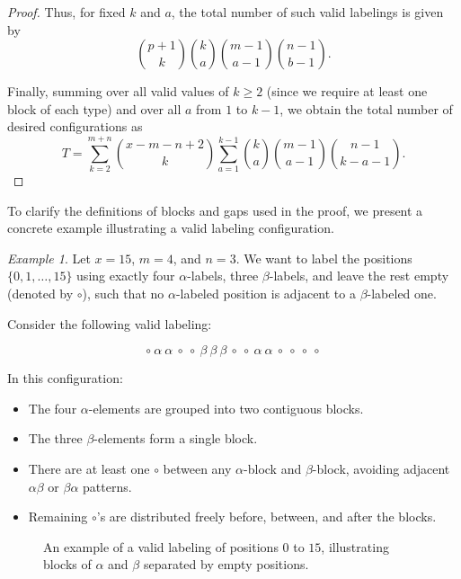 \documentclass{birkjour}
\theoremstyle{definition}
\theoremstyle{remark}
\newtheorem*{example}{Example}
\numberwithin{equation}{section}
\begin{document}
\begin{proof}
Thus, for fixed \( k \) and \( a \), the total number of such valid labelings is given by
\[
\binom{p+1}{k} \binom{k}{a} \binom{m-1}{a-1} \binom{n-1}{b-1}.
\]

Finally, summing over all valid values of \( k \geq 2 \) (since we require at least one block of each type) and over all \( a \) from \( 1 \) to \( k - 1 \), we obtain the total number of desired configurations as
\[
T = \sum_{k=2}^{m+n} \binom{x - m - n + 2}{k} \sum_{a=1}^{k-1} \binom{k}{a} \binom{m - 1}{a - 1} \binom{n - 1}{k - a - 1}.
\]
\end{proof}
To clarify the definitions of blocks and gaps used in the proof, we present a concrete example illustrating a valid labeling configuration.
\begin{example}
Let \( x = 15 \), \( m = 4 \), and \( n = 3 \). We want to label the positions \( \{0,1,\dots,15\} \) using exactly four \( \alpha \)-labels, three \( \beta \)-labels, and leave the rest empty (denoted by \( \circ \)), such that no \( \alpha \)-labeled position is adjacent to a \( \beta \)-labeled one.

Consider the following valid labeling:

\[
\circ\ \alpha\ \alpha\ \circ\ \circ\ \beta\ \beta\ \beta\ \circ\ \circ\ \alpha\ \alpha\ \circ\ \circ\ \circ\ \circ
\]

In this configuration:
\begin{itemize}
    \item The four \( \alpha \)-elements are grouped into two contiguous blocks.
    \item The three \( \beta \)-elements form a single block.
    \item There are at least one \( \circ \) between any \( \alpha \)-block and \( \beta \)-block, avoiding adjacent \( \alpha\beta \) or \( \beta\alpha \) patterns.
    \item Remaining \( \circ \)'s are distributed freely before, between, and after the blocks.
\end{itemize}
\begin{figure}[H]
\centering
{}
\caption{An example of a valid labeling of positions \( 0 \) to \( 15 \), illustrating blocks of \( \alpha \) and \( \beta \) separated by empty positions.}
\label{fig:block-example}
\end{figure}\end{example}
\end{document}
